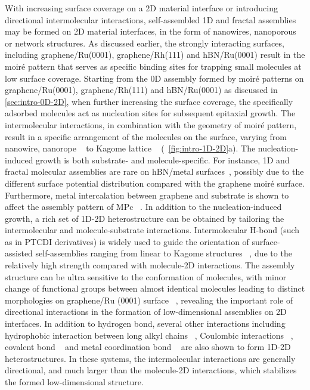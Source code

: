 With increasing surface coverage on a 2D material interface or
introducing directional intermolecular interactions, self-assembled 1D
and fractal assemblies may be formed on 2D material interfaces, in the
form of nanowires, nanoporous or network structures.
%
As discussed earlier, the strongly interacting surfaces, including
graphene/\allowbreak{}Ru(0001), graphene/Rh(111) and hBN/Ru(0001)
result in the moiré pattern that serves as specific binding sites for
trapping small molecules at low surface coverage.  Starting from the
0D assembly formed by moiré patterns on
graphene/\allowbreak{}Ru(0001), graphene/Rh(111) and hBN/Ru(0001) as
discussed in \autoref{sec:intro-0D-2D}, when further increasing the
surface coverage, the specifically adsorbed molecules act as
nucleation sites for subsequent epitaxial growth.  The intermolecular
interactions, in combination with the geometry of moiré pattern,
result in a specific arrangement of the molecules on the surface,
varying from nanowire, nanorope ~\cite{Maccariello_2014_TCNQ_gr_Ru} to
Kagome lattice ~\cite{Atwood_2002_kagome,Mao_2009_Pc_gr_kagome}
(~\autoref{fig:intro-1D-2D}a).
%
The nucleation-induced growth is both substrate- and
molecule-specific. For instance, 1D and fractal molecular assemblies
are rare on hBN/metal
surfaces~\cite{Schulz_2013_copc_hbn_moire,Schulz_2014_hBN_moire,Iannuzzi_2014_MPc_hBN_Rh,Joshi_2014_TCNQ_hBN},
possibly due to the different surface potential distribution compared
with the graphene moiré surface. Furthermore, metal intercalation
between graphene and substrate is shown to affect the assembly pattern
of MPc
~\cite{Bazarnik_2013_tailor_Fe_Co_gr_Ir,Avvisati_2017_FePc_intercal}.
%
In addition to the nucleation-induced growth, a rich set of 1D-2D
heterostructure can be obtained by tailoring the intermolecular and
molecule-substrate interactions.
%
Intermolecular H-bond (such as in PTCDI derivatives) is widely used to
guide the orientation of surface-assisted self-assemblies ranging from
linear to Kagome structures ~\cite{Slater_2014_HBond_assembl_rev,
  Pollard_2010_hbond_assembly_gr, }, due to the relatively high
strength compared with molecule-2D interactions.
%
The assembly structure can be ultra sensitive to the conformation of
molecules, with minor change of functional groups between almost
identical molecules leading to distinct morphologies on graphene/\allowbreak{}Ru
(0001) surface
~\cite{Meier_2010_polycyclic_gr,Roos_2011_BTP_gr,Roos_2011_hiera_org_gr},
revealing the important role of directional interactions in the
formation of low-dimensional assemblies on 2D
interfaces.
%
In addition to hydrogen bond, several other interactions including
hydrophobic interaction between long alkyl chains
~\cite{De_Feyter_2003_2D_assem_rev, Deshpande_2012_1D_assemb_gr},
Coulombic interactions ~\cite{Prado_2011_2D_acid_gr}, covalent bond
~\cite{Colson_2011_2DMOF_gr,Colson_2014_2D_COF_gr} and metal
coordination bond ~\cite{Urgel_2015_MOF_BN} are also shown to form
1D-2D heterostructures. In these systems, the intermolecular
interactions are generally directional, and much larger than the molecule-2D
interactions, which stabilizes the formed low-dimensional structure.

